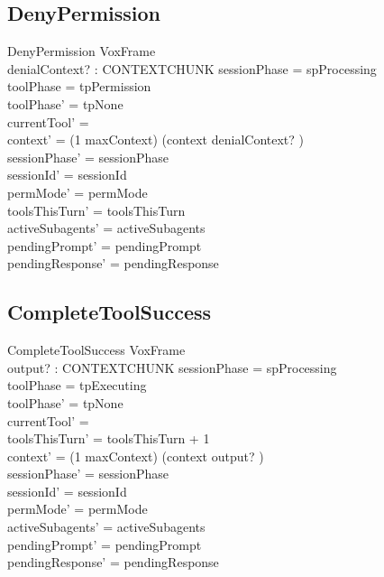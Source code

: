 \documentclass[a4paper,10pt,fleqn]{article}
\begin{document}
\subsection{DenyPermission}

\begin{schema}{DenyPermission}
  VoxFrame \\
  denialContext? : CONTEXTCHUNK
  \where
  sessionPhase = spProcessing \\
  toolPhase = tpPermission \\
  toolPhase' = tpNone \\
  currentTool' = \emptyset \\
  context' = (1 \upto maxContext) \dres (context \cat \langle denialContext? \rangle) \\
  sessionPhase' = sessionPhase \\
  sessionId' = sessionId \\
  permMode' = permMode \\
  toolsThisTurn' = toolsThisTurn \\
  activeSubagents' = activeSubagents \\
  pendingPrompt' = pendingPrompt \\
  pendingResponse' = pendingResponse
\end{schema}

\subsection{CompleteToolSuccess}

\begin{schema}{CompleteToolSuccess}
  VoxFrame \\
  output? : CONTEXTCHUNK
  \where
  sessionPhase = spProcessing \\
  toolPhase = tpExecuting \\
  toolPhase' = tpNone \\
  currentTool' = \emptyset \\
  toolsThisTurn' = toolsThisTurn + 1 \\
  context' = (1 \upto maxContext) \dres (context \cat \langle output? \rangle) \\
  sessionPhase' = sessionPhase \\
  sessionId' = sessionId \\
  permMode' = permMode \\
  activeSubagents' = activeSubagents \\
  pendingPrompt' = pendingPrompt \\
  pendingResponse' = pendingResponse
\end{schema}
\end{document}
